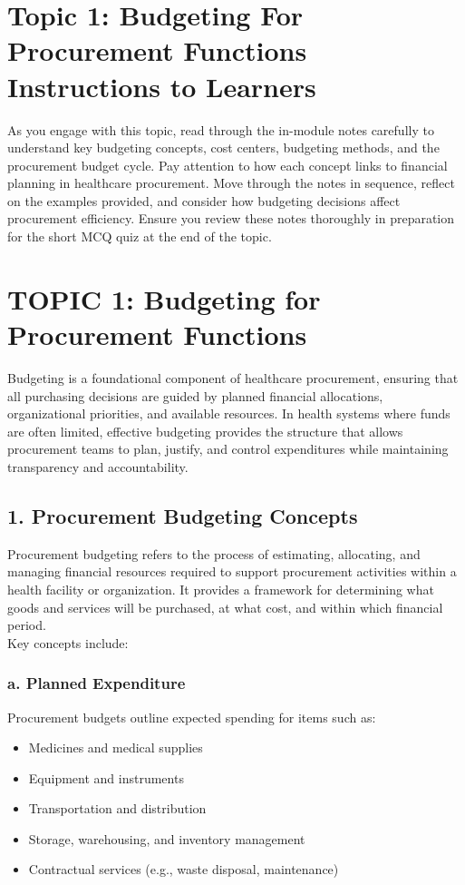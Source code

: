 \documentclass[10pt]{article}
\begin{document}
\section*{Topic 1: Budgeting For Procurement Functions Instructions to Learners}
As you engage with this topic, read through the in-module notes carefully to understand key budgeting concepts, cost centers, budgeting methods, and the procurement budget cycle. Pay attention to how each concept links to financial planning in healthcare procurement. Move through the notes in sequence, reflect on the examples provided, and consider how budgeting decisions affect procurement efficiency. Ensure you review these notes thoroughly in preparation for the short MCQ quiz at the end of the topic.

\section*{TOPIC 1: Budgeting for Procurement Functions}
Budgeting is a foundational component of healthcare procurement, ensuring that all purchasing decisions are guided by planned financial allocations, organizational priorities, and available resources. In health systems where funds are often limited, effective budgeting provides the structure that allows procurement teams to plan, justify, and control expenditures while maintaining transparency and accountability.

\subsection*{1. Procurement Budgeting Concepts}
Procurement budgeting refers to the process of estimating, allocating, and managing financial resources required to support procurement activities within a health facility or organization. It provides a framework for determining what goods and services will be purchased, at what cost, and within which financial period.\\
Key concepts include:

\subsubsection*{a. Planned Expenditure}
Procurement budgets outline expected spending for items such as:

\begin{itemize}
  \item Medicines and medical supplies
  \item Equipment and instruments
  \item Transportation and distribution
  \item Storage, warehousing, and inventory management
  \item Contractual services (e.g., waste disposal, maintenance)
\end{itemize}
\end{document}
